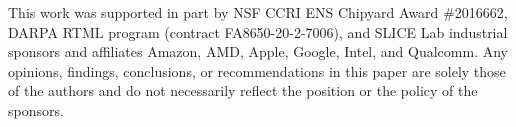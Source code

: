 \documentclass[sigplan,review,nonacm,10pt]{acmart}
\begin{document}








\begin{acks}
This work was supported in part by NSF CCRI ENS Chipyard Award \#2016662, DARPA RTML program (contract FA8650-20-2-7006), and SLICE Lab industrial sponsors and affiliates Amazon, AMD, Apple, Google, Intel, and Qualcomm.
Any opinions, findings, conclusions, or recommendations in this paper are solely those of the authors and do not necessarily reflect the position or the policy of the sponsors.
\end{acks}




\end{document}
